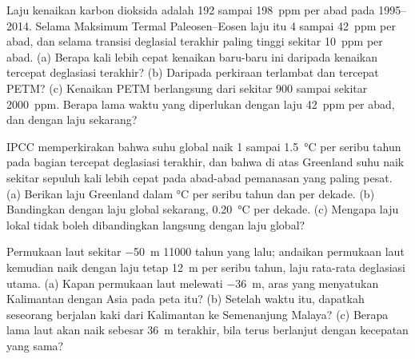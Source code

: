 \begin{exercise}[$\star\star\star$]\label{exo:g12:past-climates:13}
Laju kenaikan karbon dioksida adalah 192 sampai \qty{198}{ppm} per abad pada
1995--2014. Selama Maksimum Termal Paleosen--Eosen laju itu 4 sampai
\qty{42}{ppm} per abad, dan selama transisi deglasial terakhir paling tinggi
sekitar \qty{10}{ppm} per abad. (a) Berapa kali lebih cepat kenaikan baru-baru
ini daripada kenaikan tercepat deglasiasi terakhir? (b) Daripada perkiraan
terlambat dan tercepat PETM? (c) Kenaikan PETM berlangsung dari sekitar 900
sampai sekitar \qty{2000}{ppm}. Berapa lama waktu yang diperlukan dengan laju
\qty{42}{ppm} per abad, dan dengan laju sekarang?
\end{exercise}

\begin{exercise}[$\star\star\star$]\label{exo:g12:past-climates:14}
IPCC memperkirakan bahwa suhu global naik 1 sampai
\qty{1.5}{\degreeCelsius} per seribu tahun pada bagian tercepat deglasiasi
terakhir, dan bahwa di atas Greenland suhu naik sekitar sepuluh kali lebih
cepat pada abad-abad pemanasan yang paling pesat. (a) Berikan laju Greenland
dalam \unit{\degreeCelsius} per seribu tahun dan per dekade. (b) Bandingkan
dengan laju global sekarang, \qty{0.20}{\degreeCelsius} per dekade.
(c) Mengapa laju lokal tidak boleh dibandingkan langsung dengan laju global?
\end{exercise}

\begin{exercise}[$\star\star\star$]\label{exo:g12:past-climates:15}
Permukaan laut sekitar \qty{-50}{m} \num{11000} tahun yang lalu; andaikan
permukaan laut kemudian naik dengan laju tetap \qty{12}{m} per seribu tahun,
laju rata-rata deglasiasi utama. (a) Kapan permukaan laut melewati
\qty{-36}{m}, aras yang menyatukan Kalimantan dengan Asia pada peta itu?
(b) Setelah waktu itu, dapatkah seseorang berjalan kaki dari Kalimantan ke
Semenanjung Malaya? (c) Berapa lama laut akan naik sebesar \qty{36}{m}
terakhir, bila terus berlanjut dengan kecepatan yang sama?
\end{exercise}

